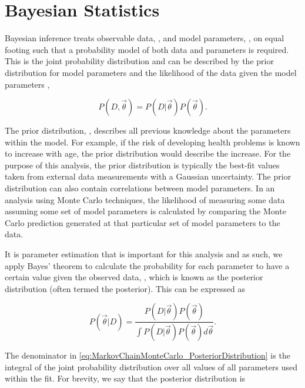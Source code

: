 \section{Bayesian Statistics}
\label{sec:MarkovChainMonteCarlo_BayesianStatistics}

Bayesian inference treats observable data, , and model parameters, \quickmath{\vec{\theta}}, on equal footing such that a probability model of both data and parameters is required. This is the joint probability distribution  and can be described by the prior distribution for model parameters  and the likelihood of the data given the model parameters ,

\begin{equation}
  P(D,\vec{\theta}) = P(D|\vec{\theta})P(\vec{\theta}).
\end{equation}

The prior distribution, , describes all previous knowledge about the parameters within the model. For example, if the risk of developing health problems is known to increase with age, the prior distribution would describe the increase. For the purpose of this analysis, the prior distribution is typically the best-fit values taken from external data measurements with a Gaussian uncertainty. The prior distribution can also contain correlations between model parameters. In an analysis using Monte Carlo techniques, the likelihood of measuring some data assuming some set of model parameters is calculated by comparing the Monte Carlo prediction generated at that particular set of model parameters to the data.

It is parameter estimation that is important for this analysis and as such, we apply Bayes' theorem \cite{Bayes:1764vd} to calculate the probability for each parameter to have a certain value given the observed data, , which is known as the posterior distribution (often termed the posterior). This can be expressed as

\begin{equation}
  \label{eq:MarkovChainMonteCarlo_PosteriorDistribution}
  P(\vec{\theta}|D) = \frac{ P(D|\vec{\theta}) P(\vec{\theta}) }{\int P(D|\vec{\theta}) P(\vec{\theta}) d\vec{\theta}}.
\end{equation}

The denominator in \autoref{eq:MarkovChainMonteCarlo_PosteriorDistribution} is the integral of the joint probability distribution over all values of all parameters used within the fit. For brevity, we say that the posterior distribution is

